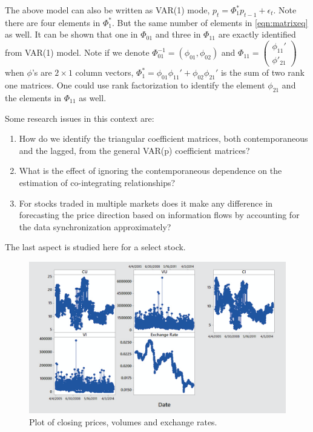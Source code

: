 The above model can also be written as VAR(1) mode, $p_t= \Phi_1^* p_{t-1} + \epsilon_t$. Note there are four elements in $\Phi_1^*$. But the same number of elements in \eqref{eqn:matrixeq} as well. It can be shown that one in $\Phi_{01}$ and three in $\Phi_{11}$ are exactly identified from VAR(1) model. Note if we denote $\Phi^{-1}_{01} = (\phi_{01},\phi_{02})$ and $\Phi_{11} = \begin{pmatrix} \phi_{11}' \\ \phi'_{21} \end{pmatrix}$ when $\phi$'s are $2 \times 1$ column vectors, $\Phi_1^*=\phi_{01}\phi_{11}' + \phi_{02} \phi_{21}'$  is the sum of two rank one matrices. One could use rank factorization to identify the element $\phi_{21}$ and the elements in $\Phi_{11}$ as well. 


Some research issues in this context are: 

\begin{enumerate}[--]
\item How do we identify the triangular coefficient matrices, both contemporaneous and the lagged, from the general VAR(p) coefficient matrices?
\item What is the effect of ignoring the contemporaneous dependence on the estimation of co-integrating relationships?
\item For stocks traded in multiple markets does it make any difference in forecasting the price direction based on information flows by accounting for the data synchronization approximately?
\end{enumerate}
The last aspect is studied here for a select stock. 


        \begin{figure}[!ht]
        \centering
        \includegraphics[width=\textwidth]{chapters/chapter_stat_ts/figures/cpver.png}
        \caption{Plot of closing prices, volumes and exchange rates. \label{fig:cpver}}
        \end{figure}


